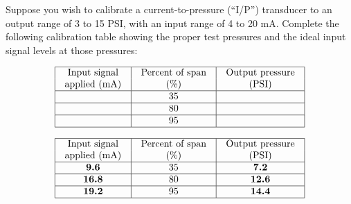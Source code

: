 

Suppose you wish to calibrate a current-to-pressure (``I/P'') transducer to an output range of 3 to 15 PSI, with an input range of 4 to 20 mA.  Complete the following calibration table showing the proper test pressures and the ideal input signal levels at those pressures:


$$\vbox{\offinterlineskip
\halign{\strut
\vrule \quad\hfil # \ \hfil & 
\vrule \quad\hfil # \ \hfil & 
\vrule \quad\hfil # \ \hfil \vrule \cr
\noalign{\hrule}
%
Input signal & Percent of span & Output pressure \cr
%
applied (mA) & (\%) & (PSI) \cr
%
\noalign{\hrule}
%
 & 35 &  \cr
%
\noalign{\hrule}
%
 & 80 &  \cr
%
\noalign{\hrule}
%
 & 95 &  \cr
%
\noalign{\hrule}
} %
}$$ %








$$\vbox{\offinterlineskip
\halign{\strut
\vrule \quad\hfil # \ \hfil & 
\vrule \quad\hfil # \ \hfil & 
\vrule \quad\hfil # \ \hfil \vrule \cr
\noalign{\hrule}
%
Input signal & Percent of span & Output pressure \cr
%
applied (mA) & (\%) & (PSI) \cr
%
\noalign{\hrule}
%
{\bf 9.6} & 35 & {\bf 7.2} \cr
%
\noalign{\hrule}
%
{\bf 16.8} & 80 & {\bf 12.6} \cr
%
\noalign{\hrule}
%
{\bf 19.2} & 95 & {\bf 14.4} \cr
%
\noalign{\hrule}
} %
}$$ %











